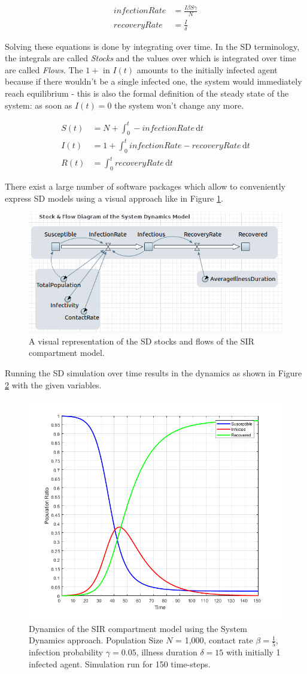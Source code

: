 \begin{align}
infectionRate &= \frac{I \beta S \gamma}{N} \\
recoveryRate &= \frac{I}{\delta} 
\end{align}

Solving these equations is done by integrating over time. In the SD terminology, the integrals are called \textit{Stocks} and the values over which is integrated over time are called \textit{Flows}. The $1+$ in $I(t)$ amounts to the initially infected agent because if there wouldn't be a single infected one, the system would immediately reach equilibrium - this is also the formal definition of the steady state of the system: as soon as $I(t) = 0$ the system won't change any more.

\begin{align}
S(t) &= N + \int_0^t -infectionRate\, \mathrm{d}t \\
I(t) &= 1 + \int_0^t infectionRate - recoveryRate\, \mathrm{d}t \\
R(t) &= \int_0^t recoveryRate\, \mathrm{d}t
\end{align}

There exist a large number of software packages which allow to conveniently express SD models using a visual approach like in Figure \ref{fig:sir_sd_stockflow_diagramm}.

\begin{figure}
	\centering
	\includegraphics[width=.4\textwidth, angle=0]{./fig/diagrams/SIR_SD_STOCKFLOW_DIAGRAMM.png}
	\caption{A visual representation of the SD stocks and flows of the SIR compartment model.} %
	\label{fig:sir_sd_stockflow_diagramm}
\end{figure}

Running the SD simulation over time results in the dynamics as shown in Figure \ref{fig:sir_sd_dynamics} with the given variables.

\begin{figure}
	\centering
	\includegraphics[width=.4\textwidth, angle=0]{./fig/step3_dataflow/SIR_SD_1000agents_150t_001dt.png}
	\caption{Dynamics of the SIR compartment model using the System Dynamics approach. Population Size $N$ = 1,000, contact rate $\beta =  \frac{1}{5}$, infection probability $\gamma = 0.05$, illness duration $\delta = 15$ with initially 1 infected agent. Simulation run for 150 time-steps.}
	\label{fig:sir_sd_dynamics}
\end{figure}

